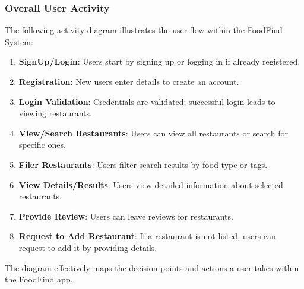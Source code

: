 \documentclass[12pt, a4paper, oneside]{article}
\begin{document}
\subsubsection{Overall User Activity}
The following  activity diagram illustrates the user flow within the FoodFind System:
\begin{enumerate}
    \item \textbf{SignUp/Login}: Users start by signing up or logging in if already registered.
    \item \textbf{Registration}: New users enter details to create an account.
    \item \textbf{Login Validation}: Credentials are validated; successful login leads to viewing restaurants.
    \item \textbf{View/Search Restaurants}: Users can view all restaurants or search for specific ones.
    \item \textbf{Filer Restaurants}: Users filter search results by food type or tags.
    \item \textbf{View Details/Results}: Users view detailed information about selected restaurants.
    \item \textbf{Provide Review}: Users can leave reviews for restaurants.
    \item \textbf{Request to Add Restaurant}: If a restaurant is not listed, users can request to add it by providing details.
\end{enumerate}
The diagram effectively maps the decision points and actions a user takes within the FoodFind app.
\end{document}
